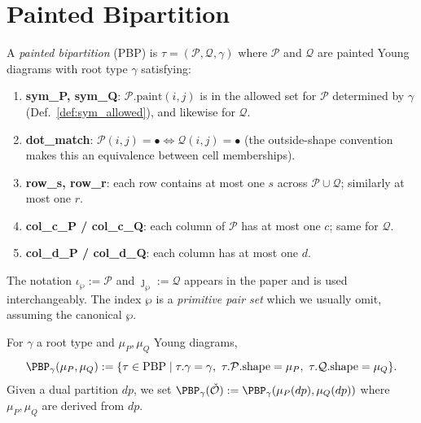 \section{Painted Bipartition}

\begin{definition}
  \label{def:PBP}
  \leanok
  A \emph{painted bipartition} (PBP) is $\tau = (\mathcal{P}, \mathcal{Q}, \gamma)$ where
  $\mathcal{P}$ and $\mathcal{Q}$ are painted Young diagrams with root type $\gamma$
  satisfying:
  \begin{enumerate}
    \item \textbf{sym\_P, sym\_Q}: $\mathcal{P}.\mathrm{paint}(i, j)$ is in the allowed set for $\mathcal{P}$ determined by $\gamma$ (Def.~\ref{def:sym_allowed}), and likewise for $\mathcal{Q}$.
    \item \textbf{dot\_match}: $\mathcal{P}(i,j) = \bullet \Leftrightarrow \mathcal{Q}(i,j) = \bullet$ (the outside-shape convention makes this an equivalence between cell memberships).
    \item \textbf{row\_s, row\_r}: each row contains at most one $s$ across $\mathcal{P} \cup \mathcal{Q}$; similarly at most one $r$.
    \item \textbf{col\_c\_P / col\_c\_Q}: each column of $\mathcal{P}$ has at most one $c$; same for $\mathcal{Q}$.
    \item \textbf{col\_d\_P / col\_d\_Q}: each column has at most one $d$.
  \end{enumerate}
\end{definition}

\begin{remark}
  The notation $\iota_\wp := \mathcal{P}$ and $\jmath_\wp := \mathcal{Q}$ appears in the paper and is used interchangeably. The index $\wp$ is a \emph{primitive pair set} which we usually omit, assuming the canonical $\wp$.
\end{remark}

\begin{definition}
  \label{def:PBPSet}
  \leanok
  For $\gamma$ a root type and $\mu_P, \mu_Q$ Young diagrams,
  \[ \PBP_\gamma(\mu_P, \mu_Q) := \{\tau \in \mathrm{PBP} \mid \tau.\gamma = \gamma,\ \tau.\mathcal{P}.\mathrm{shape} = \mu_P,\ \tau.\mathcal{Q}.\mathrm{shape} = \mu_Q\}. \]
  Given a dual partition $dp$, we set $\PBP_\gamma(\check{\mathcal{O}}) := \PBP_\gamma(\mu_P(dp), \mu_Q(dp))$ where $\mu_P, \mu_Q$ are derived from $dp$.
\end{definition}

